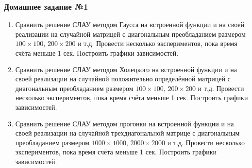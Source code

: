 \documentclass[10pt]{beamer}
\begin{document}
\begin{frame}[fragile]
\frametitle{Домашнее задание №1}

\begin{enumerate}
\item Сравнить решение СЛАУ методом Гаусса на встроенной функции и  на своей реализации на случайной матрицей с диагональным преобладанием размером $100 \times 100$, $200 \times 200$ и т.д. Провести несколько экспериментов, пока время счёта меньше 1 сек. Построить графики зависимостей.

\item Сравнить решение СЛАУ методом Холецкого на встроенной функции и  на своей реализации на случайной положительно определённой матрицей с диагональным преобладанием размером $100 \times 100$, $200 \times 200$ и т.д. Провести несколько экспериментов, пока время счёта меньше 1 сек. Построить графики зависимостей.

\item Сравнить решение СЛАУ методом прогонки на встроенной функции и  на своей реализации на случайной трехдиагональной матрице с диагональным преобладанием размером $1000 \times 1000$, $2000 \times 2000$ и т.д. Провести несколько экспериментов, пока время счёта меньше 1 сек. Построить графики зависимостей.
\end{enumerate}

\end{frame}
\end{document}
